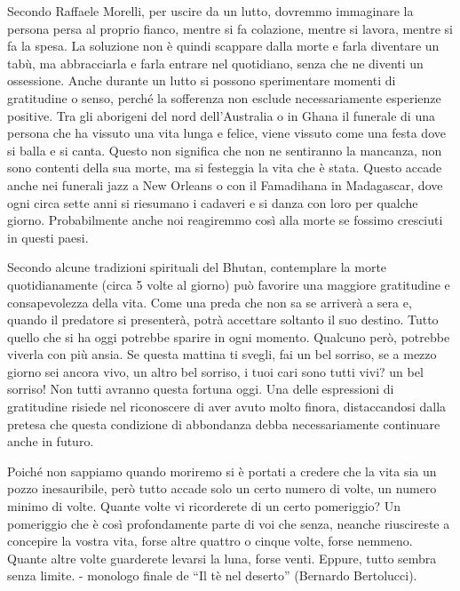 \documentclass[12pt]{book} %
\begin{document}
Secondo Raffaele Morelli, per uscire da un lutto, dovremmo immaginare la persona persa al proprio fianco, mentre si fa
colazione, mentre si lavora, mentre si fa la spesa. La soluzione non è quindi scappare dalla morte e farla diventare un
tabù, ma abbracciarla e farla entrare nel quotidiano, senza che ne diventi un ossessione. Anche durante un lutto si possono sperimentare momenti di gratitudine o senso, perché la sofferenza non esclude necessariamente esperienze positive.
Tra gli aborigeni del nord dell'Australia o in Ghana il funerale di una persona che ha vissuto una vita lunga e felice, viene
vissuto come una festa dove si balla e si canta. Questo non significa che non ne sentiranno la mancanza, non sono
contenti della sua morte, ma si festeggia la vita che è stata. Questo accade anche nei funerali jazz a New Orleans o
con il Famadihana in Madagascar, dove ogni circa sette anni si riesumano i cadaveri e si danza con loro per qualche
giorno. Probabilmente anche noi reagiremmo così alla morte se fossimo cresciuti in questi paesi.

Secondo alcune tradizioni spirituali del Bhutan, contemplare la morte quotidianamente (circa 5 volte al giorno) può favorire una maggiore gratitudine e consapevolezza della vita.
Come una preda che non sa se arriverà a sera e, quando il predatore si presenterà, potrà accettare soltanto il suo destino. Tutto quello che si ha oggi potrebbe sparire in ogni momento. Qualcuno però, potrebbe viverla con più ansia. 
Se questa mattina ti svegli, fai un bel sorriso, se a mezzo giorno sei ancora vivo, un altro bel sorriso, i tuoi cari sono tutti vivi? un bel sorriso! Non tutti avranno questa fortuna oggi.
Una delle espressioni di gratitudine risiede nel riconoscere di aver avuto molto finora, distaccandosi dalla pretesa che questa condizione di abbondanza debba necessariamente continuare anche in futuro.

Poiché non sappiamo quando moriremo si è portati a credere che la vita sia un pozzo inesauribile, però tutto accade solo
un certo numero di volte, un numero minimo di volte. Quante volte vi ricorderete di un certo pomeriggio? Un pomeriggio che è così profondamente parte di voi che senza, neanche riuscireste a concepire la vostra vita, forse altre quattro o cinque volte, forse nemmeno. Quante altre volte guarderete levarsi la luna, forse venti. Eppure, tutto sembra senza limite. - monologo finale de “Il tè nel deserto” (Bernardo Bertolucci).
\end{document}

